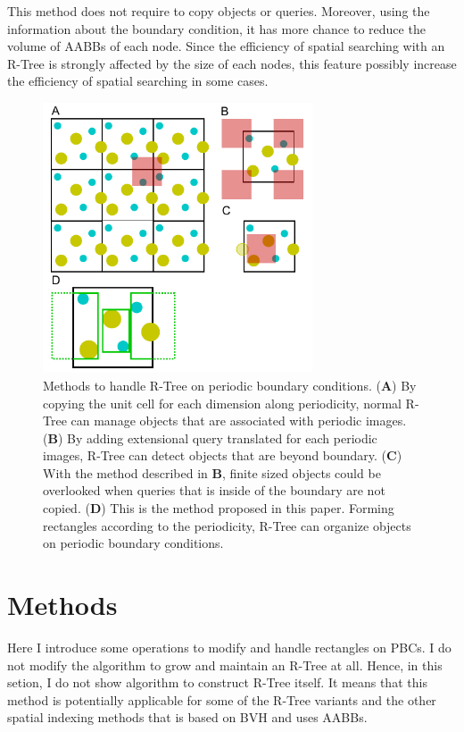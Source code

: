 \documentclass[10pt,letterpaper,twocolumn]{article}
\begin{document}
This method does not require to copy objects or queries.
Moreover, using the information about the boundary condition, it has more chance
to reduce the volume of AABBs of each node. Since the efficiency of spatial
searching with an R-Tree is strongly affected by the size of each nodes, this
feature possibly increase the efficiency of spatial searching in some cases.

\begin{figure}[hbt]
    \includegraphics[width=8.0cm, bb=6 3 220 224]{fig1.eps}
    \caption{Methods to handle R-Tree on periodic boundary conditions.
    (\textbf{A})
    By copying the unit cell for each dimension along periodicity, normal R-Tree
    can manage objects that are associated with periodic images.
    (\textbf{B})
    By adding extensional query translated for each periodic images, R-Tree can
    detect objects that are beyond boundary.
    (\textbf{C})
    With the method described in \textbf{B}, finite sized objects could be
    overlooked when queries that is inside of the boundary are not copied.
    (\textbf{D})
    This is the method proposed in this paper. Forming rectangles according to
    the periodicity, R-Tree can organize objects on periodic boundary
    conditions.}
    \label{fig-method-rtree-pbc}
\end{figure}

\section*{Methods}

Here I introduce some operations to modify and handle rectangles on PBCs.
I do not modify the algorithm to grow and maintain an R-Tree at all.
Hence, in this setion, I do not show algorithm to construct R-Tree itself.
It means that this method is potentially applicable for some of the R-Tree
variants and the other spatial indexing methods that is based on BVH and
uses AABBs.
\end{document}
